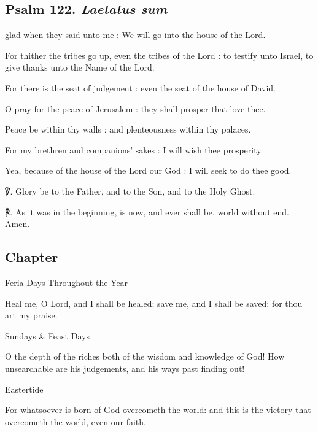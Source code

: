 \begin{multicols}{2}
\subsection{Psalm 122. \textit{Laetatus sum}}

 glad when they said unto me : We will go into the house of the Lord.\par
{}
For thither the tribes go up, even the tribes of the Lord : to testify unto Israel, to give thanks unto the Name of the Lord.\par
{}For there is the seat of judgement : even the seat of the house of David.\par
{}O pray for the peace of Jerusalem : they shall prosper that love thee.\par
{}Peace be within thy walls : and plenteousness within thy palaces.\par
{}For my brethren and companions' sakes : I will wish thee prosperity.\par
{}Yea, because of the house of the Lord our God : I will seek to do thee good.\par
℣. Glory be to the Father, and to the Son, and to the Holy Ghost.\par
℟. As it was in the beginning, is now, and ever shall be, world without end. Amen.

\subsection{Chapter}
\begin{inhead}
	Feria Days Throughout the Year
\end{inhead}\par\noindent
Heal me, O Lord, and I shall be healed; save me, and I shall be saved: for thou art my praise.

\begin{inhead}
	Sundays \& Feast Days
\end{inhead}\par\noindent
O the depth of the riches both of the wisdom and knowledge of God! How unsearchable are his judgements, and his ways past finding out!

\begin{inhead}
	Eastertide
\end{inhead}\par\noindent
For whatsoever is born of God overcometh the world: and this is the victory that overcometh the world, even our faith.


\end{multicols}
